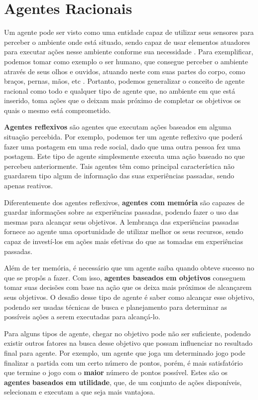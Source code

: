 \section{\label{section:agents}Agentes Racionais}
Um agente pode ser visto como uma entidade capaz de utilizar seus sensores para
perceber o ambiente onde está situado, sendo capaz de usar elementos atuadores
para executar ações nesse ambiente conforme sua necessidade
\cite{Russell:1995:AIM:193191}. Para exemplificar, podemos tomar como exemplo o
ser humano, que consegue perceber o ambiente através de seus olhos e ouvidos,
atuando neste com suas partes do corpo, como braços, pernas, mãos, etc
\cite{Russell:1995:AIM:193191}. Portanto, podemos generalizar o conceito de
agente racional como todo e qualquer tipo de agente que, no ambiente em que
está inserido, toma ações que o deixam mais próximo de completar os objetivos
os quais o mesmo está comprometido.

\textbf{Agentes reflexivos} são agentes que executam ações baseados em alguma
situação percebida. Por exemplo, podemos ter um agente reflexivo que poderá
fazer uma postagem em uma rede social, dado que uma outra pessoa fez uma
postagem. Este tipo de agente simplesmente executa uma ação baseado no que
percebeu anteriormente. Tais agentes têm como principal característica não
guardarem tipo algum de informação das suas experiências passadas, sendo apenas
reativos.

Diferentemente dos agentes reflexivos, \textbf{agentes com memória} são capazes
de guardar informações sobre as experiências passadas, podendo fazer o uso das
mesmas para alcançar seus objetivos. A lembrança das experiências passadas
fornece ao agente uma oportunidade de utilizar melhor os seus recursos, sendo
capaz de investí-los em ações mais efetivas do que as tomadas em experiências
passadas.

Além de ter memória, é necessário que um agente saiba quando obteve sucesso no
que se propôs a fazer. Com isso, \textbf{agentes baseados em objetivos}
conseguem tomar suas decisões com base na ação que os deixa mais próximos de
alcançarem seus objetivos. O desafio desse tipo de agente é saber como alcançar
esse objetivo, podendo ser usadas técnicas de busca e planejamento para
determinar as possíveis ações a serem executadas para alcançá-lo.

Para alguns tipos de agente, chegar no objetivo pode não ser suficiente,
podendo existir outros fatores na busca desse objetivo que possam influenciar
no resultado final para agente. Por exemplo, um agente que joga um determinado
jogo pode finalizar a partida com um certo número de pontos, porém, é mais
satisfatório que termine o jogo com o \textbf{maior} número de pontos
possível. Estes são os \textbf{agentes baseados em utilidade}, que, de um
conjunto de ações disponíveis, selecionam e executam a que seja mais vantajosa.

